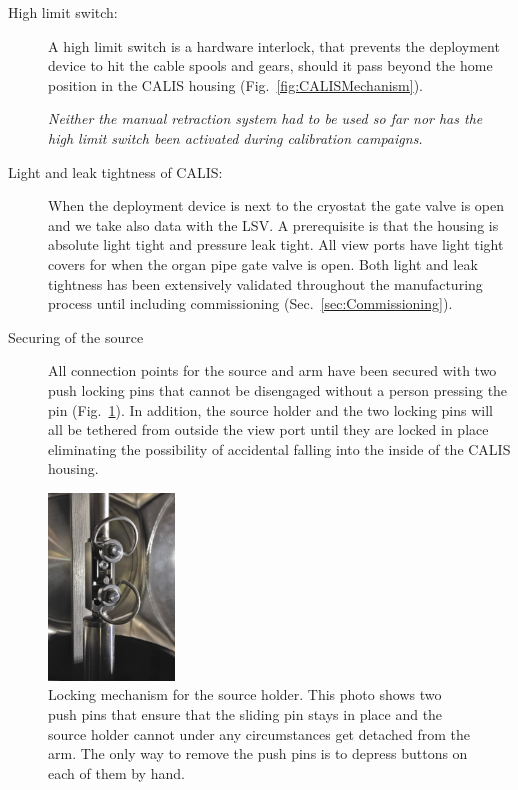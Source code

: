 \begin{description}
\item[High limit switch:]
A high limit switch is a hardware interlock, that prevents the deployment device to hit the cable spools and gears, should it pass beyond the home position in the CALIS housing (Fig.~\ref{fig:CALISMechanism}). 

\textit{Neither the manual retraction system had to be used so far nor has the high limit switch been activated during calibration campaigns.}
    
\item[Light and leak tightness of CALIS:]
When the deployment device is next to the cryostat the gate valve is open and we take also data with the LSV. A prerequisite is that the housing is absolute light tight and pressure leak tight. All view ports have light tight covers for when the organ pipe gate valve is open. Both light and leak tightness has been extensively validated throughout the manufacturing process until including commissioning (Sec.~\ref{sec:Commissioning}).

\item[Securing of the source]
All connection points for the source and arm have been secured with two push locking pins that cannot be disengaged without a person pressing the pin (Fig.~\ref{fig:sourceHolder_locking}). In addition, the source holder and the two locking pins will all be tethered from outside the view port until they are locked in place eliminating the possibility of accidental falling into the inside of the CALIS housing.

\end{description}
	

\begin{figure}[htbp]
 \centering
 \includegraphics[width=0.3\textwidth]{Figures/sourceHolder_locking}
 \caption{Locking mechanism for the source holder. This photo shows two push pins that ensure that the sliding pin stays in place and the source holder cannot under any circumstances get detached from the arm.  The only way to remove the push pins is to depress buttons on each of them by hand.}
 \label{fig:sourceHolder_locking}
\end{figure}

